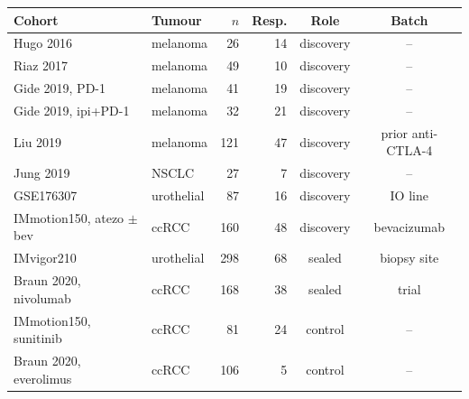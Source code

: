 \begin{tabular}{llrrcc}
\toprule
Cohort & Tumour & $n$ & Resp. & Role & Batch \\
\midrule
Hugo 2016 & melanoma & 26 & 14 & discovery & -- \\
Riaz 2017 & melanoma & 49 & 10 & discovery & -- \\
Gide 2019, PD-1 & melanoma & 41 & 19 & discovery & -- \\
Gide 2019, ipi+PD-1 & melanoma & 32 & 21 & discovery & -- \\
Liu 2019 & melanoma & 121 & 47 & discovery & prior anti-CTLA-4 \\
Jung 2019 & NSCLC & 27 & 7 & discovery & -- \\
GSE176307 & urothelial & 87 & 16 & discovery & IO line \\
IMmotion150, atezo $\pm$ bev & ccRCC & 160 & 48 & discovery & bevacizumab \\
IMvigor210 & urothelial & 298 & 68 & sealed & biopsy site \\
Braun 2020, nivolumab & ccRCC & 168 & 38 & sealed & trial \\
IMmotion150, sunitinib & ccRCC & 81 & 24 & control & -- \\
Braun 2020, everolimus & ccRCC & 106 & 5 & control & -- \\
\bottomrule
\end{tabular}
